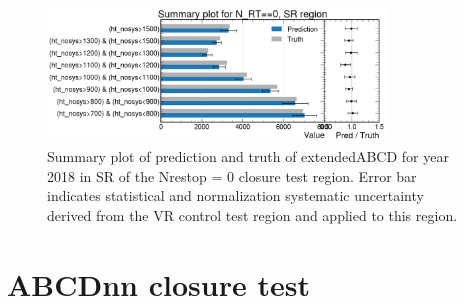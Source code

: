 \documentclass[twoside]{article}
\begin{document}
\begin{figure}[htbp]
  \centering
  \includegraphics[width=0.8\textwidth]{plots/extendedabcd_closure_sr.png} %
  \caption{Summary plot of prediction and truth of extendedABCD for year 2018 in SR of the Nrestop = 0 closure test region. Error bar indicates statistical and normalization systematic uncertainty derived from the VR control test region and applied to this region.}
  \label{fig:extendedabcd_syst_closure_summary_sr}
\end{figure}

\clearpage

\section{ABCDnn closure test}
\label{sec:abcdnnclosuretest}
\def\imageDir{plots/abcdnn_closure_test/}
\def\imageWidth{\textwidth}  %
\end{document}
